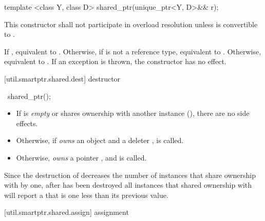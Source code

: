 %
%
\begin{itemdecl}
template <class Y, class D> shared_ptr(unique_ptr<Y, D>&& r);
\end{itemdecl}

\begin{itemdescr}
\pnum\remark This constructor shall not participate in overload resolution
unless  is convertible to .

\pnum
\effects If , equivalent to .
Otherwise, if  is not a reference type,
equivalent to .
Otherwise, equivalent to .
If an exception is thrown, the constructor has no effect.
\end{itemdescr}

[util.smartptr.shared.dest]{ destructor}

%
\begin{itemdecl}
~shared_ptr();
\end{itemdecl}

\begin{itemdescr}
\pnum\effects
\begin{itemize}
\item If  is \textit{empty} or shares ownership with another
 instance (), there are no side effects.

\item
Otherwise, if  \textit{owns} an object
 and a deleter ,  is called.

\item Otherwise,  \textit{owns} a pointer ,
and  is called.
\end{itemize}
\end{itemdescr}

\pnum
\enternote Since the destruction of 
decreases the number of instances that share ownership with 
by one,
after  has been destroyed
all  instances that shared ownership with
 will report a  that is one less
than its previous value. \exitnote

[util.smartptr.shared.assign]{ assignment}


